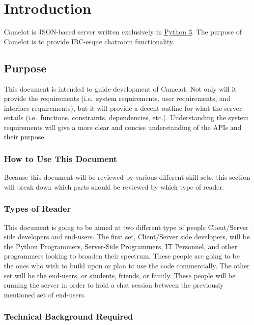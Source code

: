 \chapter{Introduction}\label{introduction}

Camelot is JSON-based server written exclusively in
\href{https://www.python.org/about/}{Python 3}. The purpose of Camelot
is to provide IRC-esque chatroom functionality.

\section{Purpose}\label{purpose}
This document is intended to guide development of Camelot. Not only will
it provide the requirements (i.e.~system requirements, user
requirements, and interface requirements), but it will provide a decent
outline for what the server entails (i.e.~functions, constraints,
dependencies, etc.). Understanding the system requirements will give a
more clear and concise understanding of the APIs and their purpose.

\subsection{How to Use This Document}\label{how-to-use-this-document}
Because this document will be reviewed by various different skill sets,
this section will break down which parts should be reviewed by which
type of reader.

\subsection{Types of Reader}\label{types-of-reader}
This document is going to be aimed at two different type of people
Client/Server side developers and end-users. The first set,
Client/Server side developers, will be the Python Programmers,
Server-Side Programmers, IT Personnel, and other programmers looking to
broaden their spectrum. These people are going to be the ones who wish
to build upon or plan to use the code commercially. The other set will
be the end-users, or students, friends, or family. These people will be
running the server in order to hold a chat session between the
previously mentioned set of end-users.

\subsection{Technical Background
Required}\label{technical-background-required}


